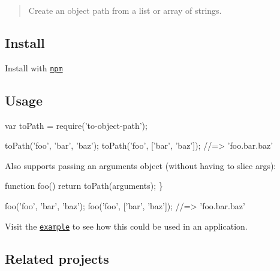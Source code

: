 \begin{quote}
Create an object path from a list or array of strings. \end{quote}


\subsection*{Install}

Install with \href{https://www.npmjs.com/}{\tt npm}




\subsection*{Usage}


\begin{DoxyCode}
var toPath = require('to-object-path');

toPath('foo', 'bar', 'baz');
toPath('foo', ['bar', 'baz']);
//=> 'foo.bar.baz'
\end{DoxyCode}


Also supports passing an arguments object (without having to slice args)\+:


\begin{DoxyCode}
function foo()
  return toPath(arguments);
\}

foo('foo', 'bar', 'baz');
foo('foo', ['bar', 'baz']);
//=> 'foo.bar.baz'
\end{DoxyCode}


Visit the \href{./example.js}{\tt example} to see how this could be used in an application.

\subsection*{Related projects}


